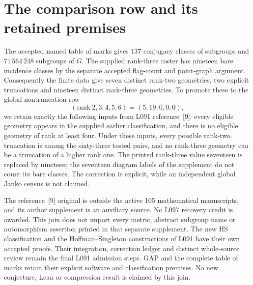 \documentclass[11pt]{article}
\begin{document}
\section*{The comparison row and its retained premises}
The accepted named table of marks gives $137$ conjugacy classes of
subgroups and $71\,564\,248$ subgroups of $G$. The supplied rank-three
roster has nineteen bare incidence classes by the separate accepted
flag-count and point-graph argument. Consequently the finite data give
seven distinct rank-two geometries, two explicit truncations and nineteen
distinct rank-three geometries. To promote these to the global
nontruncation row
\[
 (\mathrm{rank}\ 2,3,4,5,6)=(5,19,0,0,0),
\]
we retain exactly the following inputs from L091 reference~[9]: every
eligible geometry appears in the supplied earlier classification, and
there is no eligible geometry of rank at least four. Under these inputs,
every possible rank-two truncation is among the sixty-three tested pairs,
and no rank-three geometry can be a truncation of a higher rank one.
The printed rank-three value seventeen is replaced by nineteen; the
seventeen diagram labels of the supplement do not count its bare classes.
The correction is explicit, while an independent global Janko census
is not claimed.

The reference~[9] original is outside the active 105 mathematical
manuscripts, and its author supplement is an auxiliary source. No L097
recovery credit is awarded. This join does not import every metric,
abstract subgroup name or automorphism assertion printed in that
separate supplement. The new HS classification and the Hoffman--Singleton
constructions of L091 have their own accepted proofs. Their integration,
correction ledger and distinct whole-source review remain the final
L091 admission steps. GAP and the complete table of marks retain their
explicit software and classification premises. No new conjecture,
Lean or compression result is claimed by this join.
\end{document}
